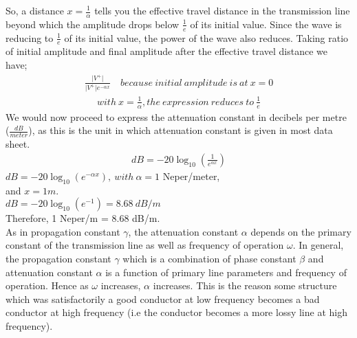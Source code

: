 So, a distance $x = \frac{1}{\alpha}$ tells you the effective travel distance in the transmission line beyond which the amplitude drops below $\frac{1}{e}$ of its initial value. Since the wave is reducing to $\frac{1}{e}$ of its initial value, the power of the wave also reduces. Taking ratio of initial amplitude and final amplitude after the effective travel distance we have;
\begin{align*}
 \frac{\lvert V^+\rvert}{\lvert V^+\rvert e ^{-\alpha x}} \quad because\ initial\ amplitude\ is\ at\ x = 0
\end{align*}
\begin{align*}
with\ x = \frac{1}{\alpha}, the\ expression\ reduces \ to\ \frac{1}{e}
\end{align*}
We would now proceed to express the attenuation constant in decibels per metre ($\frac{dB}{meter}$), as this is the unit in which attenuation constant is given in most data sheet.
\begin{align*}
dB = -20\log_{10}(\frac{1}{e^{\alpha x}})
\end{align*}
$ dB = -20\log_{10}(e^{-\alpha x}), \ with \ \alpha = 1 $ Neper/meter,\\ and $ x = 1m $. \\
$ dB = -20\log_{10}(e^{-1}) = 8.68\ dB/m  $\\
Therefore, 1 Neper/m = 8.68 dB/m.\\

As in propagation constant $\gamma$, the attenuation constant $\alpha$ depends on the primary constant of the transmission line as well as frequency of operation $\omega$. In general, the propagation constant $\gamma$ which is a combination of phase constant $\beta$ and attenuation constant $\alpha$ is a function of primary line parameters and frequency of operation. Hence as $\omega$ increases, $\alpha$ increases. This is the reason some structure which was satisfactorily a good conductor at low frequency becomes a bad conductor at high frequency (i.e the conductor becomes a more lossy line at high frequency).

